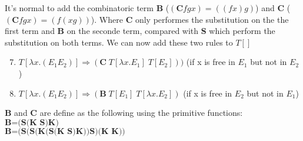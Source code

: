 It's normal to add the combinatoric term \textbf{B} ($(\textbf{C} f g x) = ((f x )g)$) and \textbf{C} ($(\textbf{C} f g x) = (f (x g))$). Where \textbf{C} only performes the substitution on 
the the first term and \textbf{B} on the seconde term, compared with \textbf{S} which perform the substitution on both terms.
We can now add these two rules to $T[]$
\begin{enumerate}
    \setcounter{enumi}{6}
    \item $T[\lambda x.(E_1 E_2)] \Rightarrow (\textbf{C} \; T[\lambda x.E_1] \; T[E_2]))$ (if x is free in $E_1$ but not in $E_2$)
    \item $T[\lambda x.(E_1 E_2)] \Rightarrow (\textbf{B} \; T[E_1] \; T[\lambda x.E_2])$ (if x is free in $E_2$ but not in $E_1$)
\end{enumerate}
\textbf{B} and \textbf{C} are define as the following using the primitive functions:\\
$\textbf{B=(S(K S)K)}$\\
$\textbf{B=(S(S(K(S(K S)K))S)(K K))}$\\


